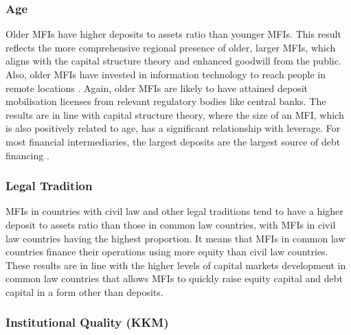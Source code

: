\documentclass[a4paper, nobind]{templates/ociamthesis}
\begin{document}
\hypertarget{age-4}{%
\subsubsection{Age}\label{age-4}}

Older MFIs have higher deposits to assets ratio than younger MFIs. This result reflects the more comprehensive regional presence of older, larger MFIs, which aligns with the capital structure theory \autocite{barclay2005capital,barclay2006debt} and enhanced goodwill from the public. Also, older MFIs have invested in information technology to reach people in remote locations \autocite{di2021technology}. Again, older MFIs are likely to have attained deposit mobilisation licenses from relevant regulatory bodies like central banks. The results are in line with capital structure theory, where the size of an MFI, which is also positively related to age, has a significant relationship with leverage. For most financial intermediaries, the largest deposits are the largest source of debt financing \autocite{gale2020bank}.

\hypertarget{legal-tradition-3}{%
\subsubsection{Legal Tradition}\label{legal-tradition-3}}

MFIs in countries with civil law and other legal traditions tend to have a higher deposit to assets ratio than those in common law countries, with MFIs in civil law countries having the highest proportion. It means that MFIs in common law countries finance their operations using more equity than civil law countries. These results are in line with the higher levels of capital markets development in common law countries \autocite{la2013law,schnyder2018twenty} that allows MFIs to quickly raise equity capital and debt capital in a form other than deposits.

\hypertarget{institutional-quality-kkm-1}{%
\subsubsection{Institutional Quality (KKM)}\label{institutional-quality-kkm-1}}
\end{document}
